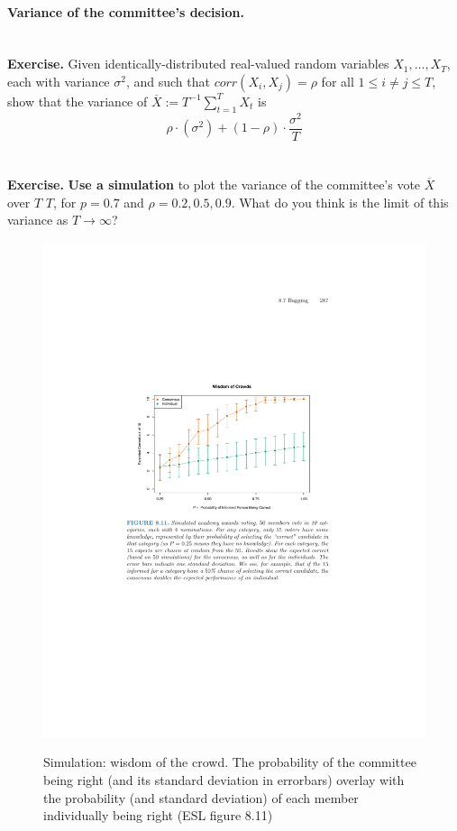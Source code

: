 \documentclass[11pt]{article}
\begin{document}
\paragraph{Variance of the committee's decision.} 
~\\
{\bf Exercise.} Given identically-distributed real-valued 
random variables $X_1,\ldots,X_T$, each with variance $\sigma^2$, and such that
$corr(X_i,X_j)=\rho$ for all $1\leq i\neq j\leq T$, show that the
variance of $\overline{X}:=T^{-1}\sum_{t=1}^T X_t$ is 
\[\rho\cdot(\sigma^2) + (1-\rho)\cdot \frac{\sigma^2}{T}
\]
\\~\\
  {\bf Exercise.} 
  {\bf Use a simulation} to plot the variance of the committee's vote $\overline{X}$ 
over $T$ 
 $T$, for $p=0.7$ 
  and $\rho=0.2, 0.5, 0.9$. What do you think is the limit of this variance as $T\to\infty$? 




  \begin{figure}[H]
  \centering
  \includegraphics[width=4.5in]{crowds.pdf}  \\
  \caption{Simulation: wisdom of the crowd. The probability of the committee
    being right (and its standard deviation in errorbars) 
    overlay with the probability (and standard deviation) of each member individually being
right (ESL figure 8.11)}
\label{fig:crowds}
\end{figure}
\end{document}
